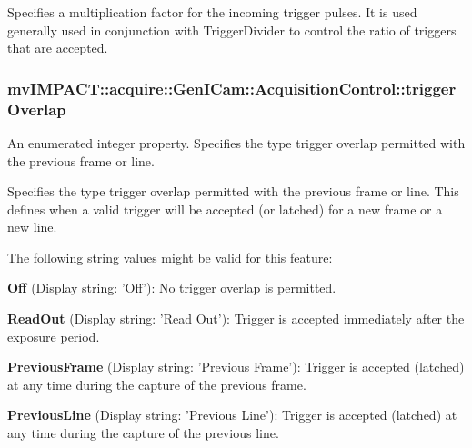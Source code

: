 Specifies a multiplication factor for the incoming trigger pulses. It is used generally used in conjunction with Trigger\+Divider to control the ratio of triggers that are accepted. \hypertarget{classmv_i_m_p_a_c_t_1_1acquire_1_1_gen_i_cam_1_1_acquisition_control_ad24c28a7ee11b61889ba6371c6023231}{
\subsubsection[{trigger\+Overlap}]{ mv\+I\+M\+P\+A\+C\+T\+::acquire\+::\+Gen\+I\+Cam\+::\+Acquisition\+Control\+::trigger\+Overlap}}\label{classmv_i_m_p_a_c_t_1_1acquire_1_1_gen_i_cam_1_1_acquisition_control_ad24c28a7ee11b61889ba6371c6023231}


An enumerated integer property. Specifies the type trigger overlap permitted with the previous frame or line. 

Specifies the type trigger overlap permitted with the previous frame or line. This defines when a valid trigger will be accepted (or latched) for a new frame or a new line.

The following string values might be valid for this feature\+:
\begin{DoxyItemize}
\item {\bfseries Off} (Display string\+: 'Off')\+: No trigger overlap is permitted.
\item {\bfseries Read\+Out} (Display string\+: 'Read Out')\+: Trigger is accepted immediately after the exposure period.
\item {\bfseries Previous\+Frame} (Display string\+: 'Previous Frame')\+: Trigger is accepted (latched) at any time during the capture of the previous frame.
\item {\bfseries Previous\+Line} (Display string\+: 'Previous Line')\+: Trigger is accepted (latched) at any time during the capture of the previous line.
\end{DoxyItemize}

